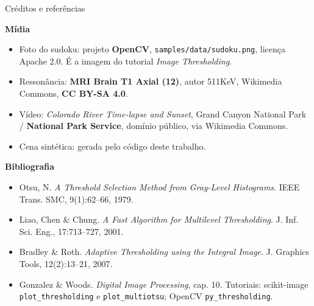 \documentclass[aspectratio=169,12pt]{beamer}
\begin{document}
\begin{frame}{Créditos e referências}

  \footnotesize
  \textbf{Mídia}

  \begin{itemize}
    \item Foto do sudoku: projeto \textbf{OpenCV}, \texttt{samples/data/sudoku.png},
      licença Apache 2.0. É a imagem do tutorial \emph{Image Thresholding}.
    \item Ressonância: \textbf{MRI Brain T1 Axial (12)}, autor 511KeV,
      Wikimedia Commons, \textbf{CC BY-SA 4.0}.
    \item Vídeo: \emph{Colorado River Time-lapse and Sunset}, Grand Canyon
      National Park / \textbf{National Park Service}, domínio público, via
      Wikimedia Commons.
    \item Cena sintética: gerada pelo código deste trabalho.
  \end{itemize}

  \vspace{.1em}
  \textbf{Bibliografia}

  \scriptsize
  \begin{itemize}
    \item Otsu, N. \emph{A Threshold Selection Method from Gray-Level
      Histograms}. IEEE Trans. SMC, 9(1):62--66, 1979.
    \item Liao, Chen \& Chung. \emph{A Fast Algorithm for Multilevel
      Thresholding}. J. Inf. Sci. Eng., 17:713--727, 2001.
    \item Bradley \& Roth. \emph{Adaptive Thresholding using the Integral
      Image}. J. Graphics Tools, 12(2):13--21, 2007.
    \item Gonzalez \& Woods. \emph{Digital Image Processing}, cap. 10.
      Tutoriais: scikit-image \texttt{plot\_thresholding} e
      \texttt{plot\_multiotsu}; OpenCV \texttt{py\_thresholding}.
  \end{itemize}

\end{frame}
\end{document}
